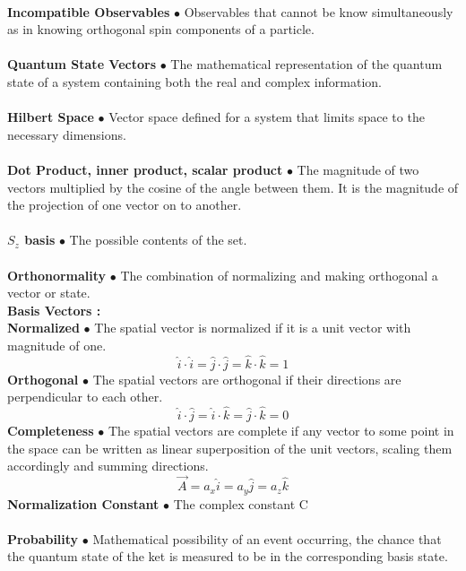 \documentclass[paper=a4, fontsize=11pt]{scrartcl} %
\numberwithin{equation}{section} %
\numberwithin{figure}{section} %
\numberwithin{table}{section} %
\begin{document}
 \\
 \textbf{Incompatible Observables} $\bullet$  Observables that cannot be know simultaneously as in knowing orthogonal spin components of a particle.\\
 \\
 \textbf{Quantum State Vectors} $\bullet$ The mathematical representation of the quantum state of a system containing both the real and complex information. \\
 \\
\textbf{Hilbert Space} $\bullet$ Vector space defined for a system that limits space to the necessary dimensions.\\
 \\
 \textbf{Dot Product, inner product, scalar product} $\bullet$ The magnitude of two vectors multiplied by the cosine of the angle between them. It is the magnitude of the projection of one vector on to another. \\
 \\
 \textbf{$S_z$ basis} $\bullet$ The possible contents of the set.\\
 \\
 \textbf{Orthonormality} $\bullet$ The combination of normalizing and making orthogonal a vector or state.\\
 \textbf{Basis Vectors :}\\
 \textbf{Normalized} $\bullet$ The spatial vector is normalized if it is a unit vector with magnitude of one.
 \begin{equation*}
  \hat{i}\cdot\hat{i}=\hat{j}\cdot\hat{j}=\hat{k}\cdot\hat{k} = 1
 \end{equation*}
 \textbf{Orthogonal} $\bullet$ The spatial vectors are orthogonal if their directions are perpendicular to each other.
 \begin{equation*}
 \hat{i}\cdot\hat{j}=\hat{i}\cdot\hat{k}=\hat{j}\cdot\hat{k} = 0
 \end{equation*}
 \textbf{Completeness} $\bullet$ The spatial vectors are complete if any vector to some point in the space can be written as linear superposition of the unit vectors, scaling them accordingly and summing directions.
 \begin{equation*}
 \vec{A} = a_x\hat{i} = a_y\hat{j} = a_z\hat{k} 
 \end{equation*}
\textbf{Normalization Constant} $\bullet$  The complex constant C\\
 \\
 \textbf{Probability} $\bullet$ Mathematical possibility of an event occurring, the chance that the quantum state of the ket is measured to be in the corresponding basis state.\\
\end{document}
